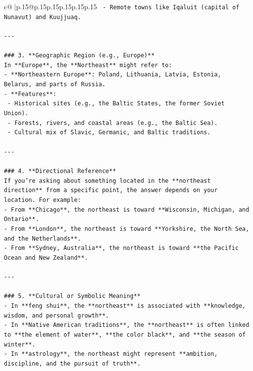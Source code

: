 \documentclass{article}
\begin{document}
{\begin{supertabular}{c@{$\;$}|p{.15\linewidth}@{}p{.15\linewidth}p{.15\linewidth}p{.15\linewidth}p{.15\linewidth}p{.15\linewidth}}
{{{\texttt{  {-} Remote towns like Iqaluit (capital of Nunavut) and Kuujjuaq.} \\
\\ 
\texttt{{-}{-}{-}} \\
\\ 
\texttt{\#\#\# 3. **Geographic Region (e.g., Europe)**} \\
\texttt{In **Europe**, the **Northeast** might refer to:} \\
\texttt{{-} **Northeastern Europe**: Poland, Lithuania, Latvia, Estonia, Belarus, and parts of Russia.} \\
\texttt{{-} **Features**:} \\
\texttt{  {-} Historical sites (e.g., the Baltic States, the former Soviet Union).} \\
\texttt{  {-} Forests, rivers, and coastal areas (e.g., the Baltic Sea).} \\
\texttt{  {-} Cultural mix of Slavic, Germanic, and Baltic traditions.} \\
\\ 
\texttt{{-}{-}{-}} \\
\\ 
\texttt{\#\#\# 4. **Directional Reference**} \\
\texttt{If you're asking about something located in the **northeast direction** from a specific point, the answer depends on your location. For example:} \\
\texttt{{-} From **Chicago**, the northeast is toward **Wisconsin, Michigan, and Ontario**.} \\
\texttt{{-} From **London**, the northeast is toward **Yorkshire, the North Sea, and the Netherlands**.} \\
\texttt{{-} From **Sydney, Australia**, the northeast is toward **the Pacific Ocean and New Zealand**.} \\
\\ 
\texttt{{-}{-}{-}} \\
\\ 
\texttt{\#\#\# 5. **Cultural or Symbolic Meaning**} \\
\texttt{{-} In **feng shui**, the **northeast** is associated with **knowledge, wisdom, and personal growth**.} \\
\texttt{{-} In **Native American traditions**, the **northeast** is often linked to **the element of water**, **the color black**, and **the season of winter**.} \\
\texttt{{-} In **astrology**, the northeast might represent **ambition, discipline, and the pursuit of truth**.} \\
}}}
\end{supertabular}}
\end{document}
